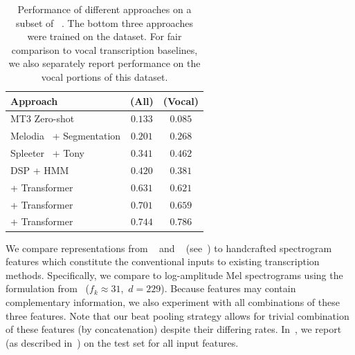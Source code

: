 \begin{table}[t]
    \centering
    \begin{tabular}{lcc}
\toprule
Approach & \fone{} (All) & \fone{} (Vocal)\\
\midrule
MT3 Zero-shot~\cite{gardner2021mt3} & $0.133$ & $0.085$ \\
Melodia~\cite{salamon2014melody} + Segmentation & $0.201$ & $0.268$ \\
Spleeter~\cite{hennequin2020spleeter} + Tony~\cite{mauch2015computer} & $0.341$ & $\bm{0.462}$ \\
DSP + HMM~\cite{ryynanen2008automatic} & $\bm{0.420}$ & $0.381$ \\
\midrule
\mel{} + Transformer & $0.631$ & $0.621$ \\
\mtthree{} + Transformer & $0.701$ & $0.659$ \\
\jukebox{} + Transformer & $\mathbf{0.744}$ & $\mathbf{0.786}$ \\
\bottomrule
    \end{tabular}
    \caption{Performance of different approaches on a subset of \rwc~\cite{goto2002rwc,goto2003rwc,goto2004development}. The bottom three approaches were trained on the \hooktheory{} dataset. For fair comparison to vocal transcription baselines, we also separately report performance on the vocal portions of this dataset.}
    \label{tab:rwc_ryy}
\end{table}

We compare representations from \jukebox~\cite{dhariwal2020jukebox} and \mtthree~\cite{gardner2021mt3} (see~) to handcrafted spectrogram features which constitute the conventional inputs to existing transcription methods. 
Specifically, we compare to log-amplitude Mel spectrograms using the formulation from~\cite{hawthorne2017onsets} (${f_k \approx 31}$,~${d = 229}$). 
Because features may contain complementary information, we also experiment with all combinations of these three features. 
Note that our beat pooling strategy allows for trivial combination of these features (by concatenation) despite their differing rates. 
In~, we report \fone{} (as described in~) on the \hooktheory{} test set for all input features.


